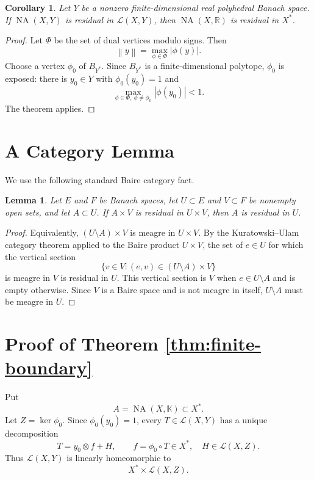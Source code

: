 \documentclass[11pt]{article}
\newtheorem{lemma}{Lemma}
\newtheorem{corollary}{Corollary}
\newcommand{\K}{\mathbb K}
\newcommand{\NA}{\operatorname{NA}}
\newcommand{\calL}{\mathcal L}
\newcommand{\norm}[1]{\left\lVert #1 \right\rVert}
\begin{document}
\begin{corollary}
Let \(Y\) be a nonzero finite-dimensional real polyhedral Banach space.  If
\(\NA(X,Y)\) is residual in \(\calL(X,Y)\), then \(\NA(X,\mathbb R)\) is
residual in \(X^*\).
\end{corollary}

\begin{proof}
Let \(\Phi\) be the set of dual vertices modulo signs.  Then
\[
  \norm{y}=\max_{\phi\in\Phi}|\phi(y)|.
\]
Choose a vertex \(\phi_0\) of \(B_{Y^*}\).  Since \(B_{Y^*}\) is a
finite-dimensional polytope, \(\phi_0\) is exposed: there is \(y_0\in Y\)
with \(\phi_0(y_0)=1\) and
\[
  \max_{\phi\in\Phi,\ \phi\neq\phi_0}|\phi(y_0)|<1.
\]
The theorem applies.
\end{proof}

\section*{A Category Lemma}

We use the following standard Baire category fact.

\begin{lemma}\label{lem:product-reflection}
Let \(E\) and \(F\) be Banach spaces, let \(U\subset E\) and \(V\subset F\)
be nonempty open sets, and let \(A\subset U\).  If \(A\times V\) is residual
in \(U\times V\), then \(A\) is residual in \(U\).
\end{lemma}

\begin{proof}
Equivalently, \((U\setminus A)\times V\) is meagre in \(U\times V\).  By the
Kuratowski--Ulam category theorem applied to the Baire product
\(U\times V\), the set of \(e\in U\) for which the vertical section
\[
  \{v\in V:(e,v)\in (U\setminus A)\times V\}
\]
is meagre in \(V\) is residual in \(U\).  This vertical section is \(V\) when
\(e\in U\setminus A\) and is empty otherwise.  Since \(V\) is a Baire space
and is not meagre in itself, \(U\setminus A\) must be meagre in \(U\).
\end{proof}

\section*{Proof of Theorem \ref{thm:finite-boundary}}

Put
\[
  A=\NA(X,\K)\subset X^*.
\]
Let \(Z=\ker\phi_0\).  Since \(\phi_0(y_0)=1\), every \(T\in\calL(X,Y)\)
has a unique decomposition
\[
  T=y_0\otimes f+H,\qquad f=\phi_0\circ T\in X^*,\quad H\in\calL(X,Z).
\]
Thus \(\calL(X,Y)\) is linearly homeomorphic to
\[
  X^*\times\calL(X,Z).
\]
\end{document}
